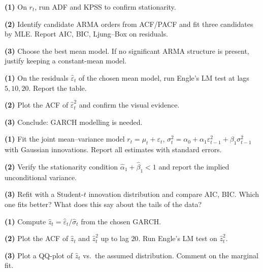 \documentclass[a4paper,11pt]{article}
\begin{document}
\begin{exercise}
\textbf{(1)} On $r_t$, run ADF and KPSS to confirm stationarity.

\textbf{(2)} Identify candidate ARMA orders from ACF/PACF and fit
three candidates by MLE. Report AIC, BIC, Ljung--Box on residuals.

\textbf{(3)} Choose the best mean model. If no significant ARMA
structure is present, justify keeping a constant-mean model.
\end{exercise}

\begin{exercise}
\textbf{(1)} On the residuals $\widehat\varepsilon_t$ of the chosen
mean model, run Engle's LM test at lags $5, 10, 20$. Report the
table.

\textbf{(2)} Plot the ACF of $\widehat\varepsilon_t^2$ and confirm
the visual evidence.

\textbf{(3)} Conclude: GARCH modelling is needed.
\end{exercise}

\begin{exercise}
\textbf{(1)} Fit the joint mean--variance model
$r_t = \mu_t + \varepsilon_t$, $\sigma_t^2 = \alpha_0 + \alpha_1
\varepsilon_{t-1}^2 + \beta_1 \sigma_{t-1}^2$ with Gaussian
innovations. Report all estimates with standard errors.

\textbf{(2)} Verify the stationarity condition $\widehat\alpha_1 +
\widehat\beta_1 < 1$ and report the implied unconditional
variance.

\textbf{(3)} Refit with a Student-$t$ innovation distribution and
compare AIC, BIC. Which one fits better? What does this say about
the tails of the data?
\end{exercise}

\begin{exercise}
\textbf{(1)} Compute $\widehat z_t = \widehat\varepsilon_t /
\widehat\sigma_t$ from the chosen GARCH.

\textbf{(2)} Plot the ACF of $\widehat z_t$ and $\widehat z_t^2$
up to lag $20$. Run Engle's LM test on $\widehat z_t^2$.

\textbf{(3)} Plot a QQ-plot of $\widehat z_t$ vs.\ the assumed
distribution. Comment on the marginal fit.
\end{exercise}
\end{document}
